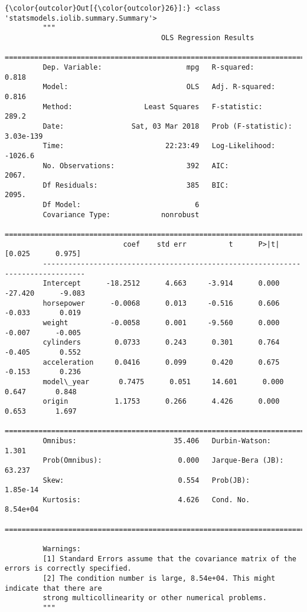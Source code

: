 \documentclass[11pt]{article}
\begin{document}
\begin{Verbatim}[commandchars=\\\{\}]
{\color{outcolor}Out[{\color{outcolor}26}]:} <class 'statsmodels.iolib.summary.Summary'>
         """
                                     OLS Regression Results                            
         ==============================================================================
         Dep. Variable:                    mpg   R-squared:                       0.818
         Model:                            OLS   Adj. R-squared:                  0.816
         Method:                 Least Squares   F-statistic:                     289.2
         Date:                Sat, 03 Mar 2018   Prob (F-statistic):          3.03e-139
         Time:                        22:23:49   Log-Likelihood:                -1026.6
         No. Observations:                 392   AIC:                             2067.
         Df Residuals:                     385   BIC:                             2095.
         Df Model:                           6                                         
         Covariance Type:            nonrobust                                         
         ================================================================================
                            coef    std err          t      P>|t|      [0.025      0.975]
         --------------------------------------------------------------------------------
         Intercept      -18.2512      4.663     -3.914      0.000     -27.420      -9.083
         horsepower      -0.0068      0.013     -0.516      0.606      -0.033       0.019
         weight          -0.0058      0.001     -9.560      0.000      -0.007      -0.005
         cylinders        0.0733      0.243      0.301      0.764      -0.405       0.552
         acceleration     0.0416      0.099      0.420      0.675      -0.153       0.236
         model\_year       0.7475      0.051     14.601      0.000       0.647       0.848
         origin           1.1753      0.266      4.426      0.000       0.653       1.697
         ==============================================================================
         Omnibus:                       35.406   Durbin-Watson:                   1.301
         Prob(Omnibus):                  0.000   Jarque-Bera (JB):               63.237
         Skew:                           0.554   Prob(JB):                     1.85e-14
         Kurtosis:                       4.626   Cond. No.                     8.54e+04
         ==============================================================================
         
         Warnings:
         [1] Standard Errors assume that the covariance matrix of the errors is correctly specified.
         [2] The condition number is large, 8.54e+04. This might indicate that there are
         strong multicollinearity or other numerical problems.
         """
\end{Verbatim}
            
\end{document}
